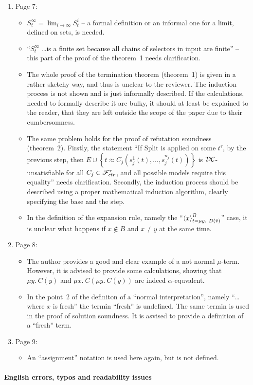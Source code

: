 \begin{enumerate}
	\item Page 7:
	\begin{itemize}
		\item $S_t^\infty = \lim_{i \rightarrow \infty} S^i_t$ -- a formal definition or an informal one for a limit, defined on sets, is needed.
		\item ``$S_t^\infty$ \dots is a finite set because all chains of selectors in input are finite'' -- this part of the proof of the theorem~1 needs clarification.
		
		\item The whole proof of the termination theorem (theorem~1) is given in a rather sketchy way, and thus is unclear to the reviewer. The induction process is not shown and is just informally described. If the calculations, needed to formally describe it are bulky, it should at least be explained to the reader, that they are left outside the scope of the paper due to their cumbersomness.
		
		\item The same problem holds for the proof of refutation soundness (theorem~2). Firstly, the statement ``If $\mathrm{Split}$ is applied on some $t^\tau$, by the previous step, then $E \cup \left\{ t \approx C_j\left( s_j^1(t),\dots,s_j^{n_j}(t) \right) \right\}$ is $\mathcal{DC}$-unsatisfiable for all $C_j \in \mathscr{F}^\tau_{ctr}$, and all possible models require this equality'' needs clarification. Secondly, the induction process should be described using a proper mathematical induction algorithm, clearly specifying the base and the step.

		\item In the definition of the expansion rule, namely the ``$\left\langle x \right\rangle^B_{t = \mu y.\ D(\bar{v})}$'' case, it is unclear what happens if $x \notin B$ and $x \ne y$ at the same time.
	\end{itemize}

	\item Page 8:
	\begin{itemize}
		\item The author provides a good and clear example of a not normal $\mu$-term. However, it is advised to provide some calculations, showing that $\mu y.\ C(y)$ and $\mu x.\ C(\mu y.\ C(y))$ are indeed $\alpha$-equvalent.

		\item In the point~2 of the definiton of a ``normal interpretation'', namely ``\dots where $x$ is fresh'' the termin ``fresh'' is undefined. The same termin is used in the proof of solution soundness. It is asvised to provide a definition of a ``fresh'' term.
	\end{itemize}

	\item Page 9:
	\begin{itemize}
		\item An ``assignment'' notation is used here again, but is not defined.
	\end{itemize}
\end{enumerate}


\paragraph{English errors, typos and readability issues}


